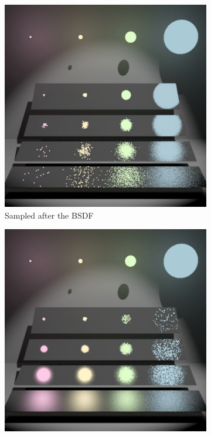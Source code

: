 \begin{figure}
    \centering
    \begin{subfigure}[b]{0.45\textwidth}
        \centering
        \includegraphics[width=\textwidth]{images/veach_mis_bsdf.png}
        \caption{Sampled after the BSDF}
        \label{fig:veach_mis_bsdf}
    \end{subfigure}
    \hfill
    \begin{subfigure}[b]{0.45\textwidth}
        \centering
        \includegraphics[width=\textwidth]{images/veach_mis_light.png}

\end{subfigure}
\end{figure}
